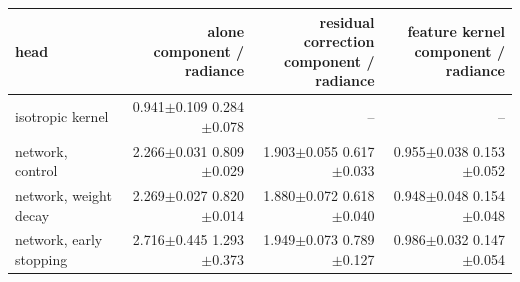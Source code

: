 {\fontsize{9}{11}\selectfont
\setlength{\tabcolsep}{3pt}
\begin{tabular}{lrrr}
\toprule
head & \thead{alone\\component / radiance} & \thead{residual correction\\component / radiance} & \thead{feature kernel\\component / radiance} \\
\midrule
isotropic kernel & \shortstack{0.941$\pm$0.109\\0.284$\pm$0.078} & -- & -- \\
network, control & \shortstack{2.266$\pm$0.031\\0.809$\pm$0.029} & \shortstack{1.903$\pm$0.055\\0.617$\pm$0.033} & \shortstack{0.955$\pm$0.038\\0.153$\pm$0.052} \\
network, weight decay & \shortstack{2.269$\pm$0.027\\0.820$\pm$0.014} & \shortstack{1.880$\pm$0.072\\0.618$\pm$0.040} & \shortstack{0.948$\pm$0.048\\0.154$\pm$0.048} \\
network, early stopping & \shortstack{2.716$\pm$0.445\\1.293$\pm$0.373} & \shortstack{1.949$\pm$0.073\\0.789$\pm$0.127} & \shortstack{0.986$\pm$0.032\\0.147$\pm$0.054} \\
\bottomrule
\end{tabular}}
